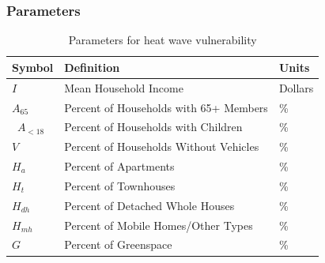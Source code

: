 \documentclass[12pt]{article}
\begin{document}
\subsubsection{Parameters}\label{params}
\begin{table}[H]
\centering
\begin{tabular}{|p{2cm}|p{8cm}|p{6cm}|}
\hline
\bf Symbol & \bf Definition & \bf Units\\ \hline
$I$ & Mean Household Income & Dollars  \\ \hline
$A_{65}$ & Percent of Households with 65+ Members & \% \\ \hline\
$A_{<18}$ & Percent of Households with Children & \%  \\ \hline
$V$ & Percent of Households Without Vehicles & \% \\ \hline
$H_a$ & Percent of Apartments & \%  \\ \hline
$H_t$ & Percent of Townhouses & \% \\ \hline
$H_{dh}$ & Percent of Detached Whole Houses & \%  \\ \hline
$H_{mh}$ & Percent of Mobile Homes/Other Types & \% \\ \hline
$G$ & Percent of Greenspace & \%  \\ \hline
\end{tabular}
\caption{Parameters for heat wave vulnerability}
\end{table}
\end{document}

